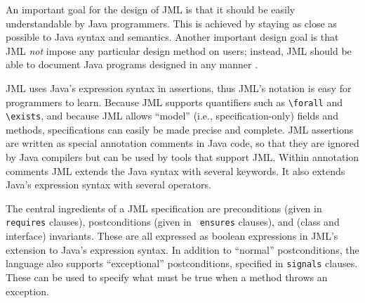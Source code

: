 An important goal for the design of JML is that it should be easily
understandable by Java programmers. This is achieved by staying as
close as possible to Java syntax and semantics.  Another important
design goal is that JML {\em not} impose any particular design method
on users; instead, JML should be able to document Java programs
designed in any manner \cite{Leavens-Baker-Ruby03}.

JML uses Java's expression syntax in assertions,
thus JML's notation is easy for programmers to learn.  
Because JML supports quantifiers such as
\verb_\forall_ and \verb_\exists_, and because JML allows ``model''
(i.e., specification-only) fields and methods, specifications can
easily be made precise and complete.
JML assertions are written as special
annotation comments in Java code,
so that they are ignored by Java compilers but can be used
by tools that support JML\@.  Within annotation comments JML extends the
Java syntax with several keywords.  It also extends Java's expression syntax with several
operators.%



The central ingredients of a JML specification are preconditions
(given in {\tt requires} clauses), postconditions (given in {\tt
  ensures} clauses), and (class and interface) invariants.  These are
all expressed as boolean expressions in JML's extension to Java's
expression syntax.
In addition to ``normal'' postconditions, the language also supports
``exceptional'' postconditions, specified in {\tt signals} clauses.
These can be used to specify what must be true when a method throws an
exception. 


